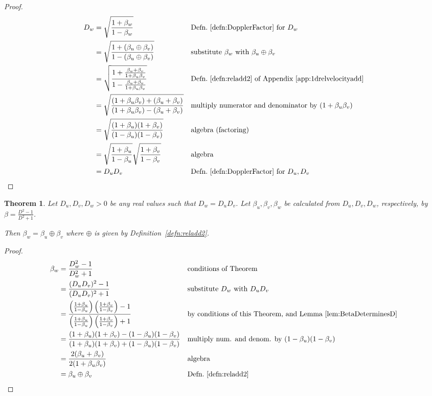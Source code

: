 \documentclass[a4paper]{article}
\theoremstyle{plain}
\newtheorem{theorem}{Theorem}
\theoremstyle{definition}
\begin{document}
\begin{proof}
\begin{align*}
D_w & = \sqrt{ \frac{1+\beta_w}{1-\beta_w} } & & \text{Defn.~\eqref{defn:DopplerFactor} for $D_w$} \\
    & = \sqrt{ \frac{1+(\beta_u \oplus \beta_v)}{1-(\beta_u \oplus \beta_v)} } & & \text{substitute $\beta_w$ with $\beta_u \oplus \beta_v$} \\
    & = \sqrt{ \frac{1+\frac{\beta_u + \beta_v}{1 + \beta_u \beta_v}}{1-\frac{\beta_u + \beta_v}{1 + \beta_u \beta_v}} } & & \text{Defn.~\eqref{defn:reladd2} of Appendix~\ref{app:1drelvelocityadd}} \\
    & = \sqrt{ \frac{(1+\beta_u \beta_v)+(\beta_u + \beta_v)}{(1+\beta_u \beta_v)-(\beta_u + \beta_v)} } & & \text{multiply numerator and denominator by $(1+\beta_u \beta_v)$} \\
    & = \sqrt{ \frac{(1+\beta_u)(1+\beta_v)}{(1-\beta_u)(1-\beta_v)} } & & \text{algebra (factoring)} \\
    & = \sqrt{\frac{1+\beta_u}{1-\beta_u}} \sqrt{\frac{1+\beta_v}{1-\beta_v}} & & \text{algebra} \\
    & = D_u D_v & & \text{Defn.~\eqref{defn:DopplerFactor} for $D_u, D_v$}
\end{align*}
\end{proof}

\begin{theorem}
\label{thm:DopplerProductLeadsTo1dRelVelAdd}
Let $D_u, D_v, D_w > 0$ be any real values such that $D_w = D_u D_v$.
Let $\beta_u, \beta_v, \beta_w$ be calculated from $D_u, D_v, D_w$,
respectively, by $\beta = \frac{D^2 - 1}{D^2 + 1}$.

Then $\beta_w = \beta_u \oplus \beta_v$
where $\oplus$ is given by Definition~\eqref{defn:reladd2}.
\end{theorem}

\begin{proof}
\begin{align*}
\beta_w & = \frac{D_w^2 - 1}{D_w^2 + 1} & & \text{conditions of Theorem} \\
        & = \frac{(D_u D_v)^2 - 1}{(D_u D_v)^2 + 1} & & \text{substitute $D_w$ with $D_u D_v$} \\
        & = \frac{\left( \frac{1+\beta_u}{1-\beta_u} \right) \left( \frac{1+\beta_v}{1-\beta_v} \right) - 1}{\left( \frac{1+\beta_u}{1-\beta_u} \right) \left( \frac{1+\beta_v}{1-\beta_v} \right) + 1} & & \text{by conditions of this Theorem, and Lemma~\ref{lem:BetaDeterminesD}} \\
        & = \frac{(1+\beta_u)(1+\beta_v) - (1-\beta_u)(1-\beta_v)}{(1+\beta_u)(1+\beta_v) + (1-\beta_u)(1-\beta_v)} & & \text{multiply num. and denom. by $(1-\beta_u)(1-\beta_v)$} \\
        & = \frac{2(\beta_u+\beta_v)}{2(1 + \beta_u\beta_v)} & & \text{algebra} \\
        & = \beta_u \oplus \beta_v & & \text{Defn.~\eqref{defn:reladd2}}
\end{align*}
\end{proof}
\end{document}
